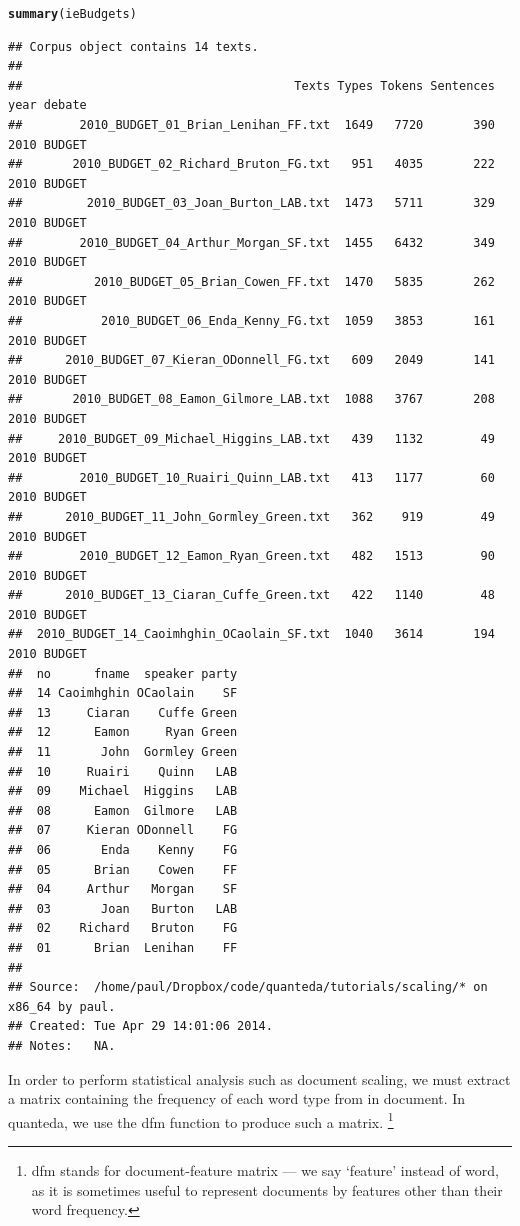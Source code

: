 \documentclass{article}\usepackage[]{graphicx}\usepackage[]{color}
\makeatletter
\newcommand{\hlstd}[1]{\textcolor[rgb]{0.345,0.345,0.345}{#1}}%
\newcommand{\hlkwd}[1]{\textcolor[rgb]{0.737,0.353,0.396}{\textbf{#1}}}%
\newenvironment{kframe}{%
 \def\at@end@of@kframe{}%
 \ifinner\ifhmode%
  \def\at@end@of@kframe{\end{minipage}}%
  \begin{minipage}{\columnwidth}%
 \fi\fi%
 \def\FrameCommand##1{\hskip\@totalleftmargin \hskip-\fboxsep
 \colorbox{shadecolor}{##1}\hskip-\fboxsep
     \hskip-\linewidth \hskip-\@totalleftmargin \hskip\columnwidth}%
 \MakeFramed {\advance\hsize-\width
   \@totalleftmargin\z@ \linewidth\hsize
   \@setminipage}}%
 {\par\unskip\endMakeFramed%
 \at@end@of@kframe}
\newenvironment{knitrout}{}{} %
\makeatother
\begin{document}
\begin{knitrout}
\color{fgcolor}\begin{kframe}
\begin{alltt}
\hlkwd{summary}\hlstd{(ieBudgets)}
\end{alltt}
\begin{verbatim}
## Corpus object contains 14 texts.
## 
##                                      Texts Types Tokens Sentences year debate
##        2010_BUDGET_01_Brian_Lenihan_FF.txt  1649   7720       390 2010 BUDGET
##       2010_BUDGET_02_Richard_Bruton_FG.txt   951   4035       222 2010 BUDGET
##         2010_BUDGET_03_Joan_Burton_LAB.txt  1473   5711       329 2010 BUDGET
##        2010_BUDGET_04_Arthur_Morgan_SF.txt  1455   6432       349 2010 BUDGET
##          2010_BUDGET_05_Brian_Cowen_FF.txt  1470   5835       262 2010 BUDGET
##           2010_BUDGET_06_Enda_Kenny_FG.txt  1059   3853       161 2010 BUDGET
##      2010_BUDGET_07_Kieran_ODonnell_FG.txt   609   2049       141 2010 BUDGET
##       2010_BUDGET_08_Eamon_Gilmore_LAB.txt  1088   3767       208 2010 BUDGET
##     2010_BUDGET_09_Michael_Higgins_LAB.txt   439   1132        49 2010 BUDGET
##        2010_BUDGET_10_Ruairi_Quinn_LAB.txt   413   1177        60 2010 BUDGET
##      2010_BUDGET_11_John_Gormley_Green.txt   362    919        49 2010 BUDGET
##        2010_BUDGET_12_Eamon_Ryan_Green.txt   482   1513        90 2010 BUDGET
##      2010_BUDGET_13_Ciaran_Cuffe_Green.txt   422   1140        48 2010 BUDGET
##  2010_BUDGET_14_Caoimhghin_OCaolain_SF.txt  1040   3614       194 2010 BUDGET
##  no      fname  speaker party
##  14 Caoimhghin OCaolain    SF
##  13     Ciaran    Cuffe Green
##  12      Eamon     Ryan Green
##  11       John  Gormley Green
##  10     Ruairi    Quinn   LAB
##  09    Michael  Higgins   LAB
##  08      Eamon  Gilmore   LAB
##  07     Kieran ODonnell    FG
##  06       Enda    Kenny    FG
##  05      Brian    Cowen    FF
##  04     Arthur   Morgan    SF
##  03       Joan   Burton   LAB
##  02    Richard   Bruton    FG
##  01      Brian  Lenihan    FF
## 
## Source:  /home/paul/Dropbox/code/quanteda/tutorials/scaling/* on x86_64 by paul.
## Created: Tue Apr 29 14:01:06 2014.
## Notes:   NA.
\end{verbatim}
\end{kframe}
\end{knitrout}


In order to perform statistical analysis such as document scaling, we must extract a matrix containing the frequency of each word type from in document. In quanteda, we use the dfm function to produce such a matrix. \footnote{dfm stands for document-feature matrix --- we say `feature' instead of word, as it is sometimes useful to represent documents by features other than their word frequency.}
\end{document}
